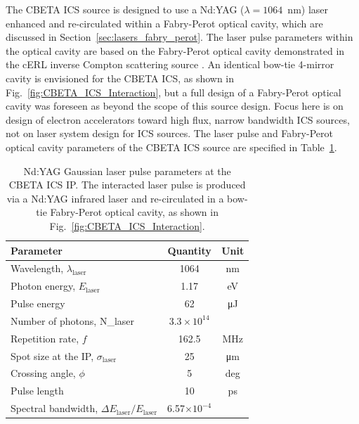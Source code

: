 \documentclass[../main.tex]{subfiles}
\begin{document}
The CBETA ICS source is designed to use a Nd:YAG ($\lambda=1064$~\si{\nano\meter}) laser enhanced and re-circulated within a Fabry-Perot optical cavity, which are discussed in Section~\ref{sec:lasers_fabry_perot}. The laser pulse parameters within the optical cavity are based on the Fabry-Perot optical cavity demonstrated in the cERL inverse Compton scattering source \cite{akagi2016narrow}. An identical bow-tie 4-mirror cavity is envisioned for the CBETA ICS, as shown in Fig.~\ref{fig:CBETA_ICS_Interaction}, but a full design of a Fabry-Perot optical cavity was foreseen as beyond the scope of this source design. Focus here is on design of electron accelerators toward high flux, narrow bandwidth ICS sources, not on laser system design for ICS sources. The laser pulse and Fabry-Perot optical cavity parameters of the CBETA ICS source are specified in Table~\ref{tab:CBETA_laser_pulse_design_parameters}. 
\begin{table}[!h]
\centering
\caption{Nd:YAG Gaussian laser pulse parameters at the CBETA ICS IP. The interacted laser pulse is produced via a Nd:YAG infrared laser and re-circulated in a bow-tie Fabry-Perot optical cavity, as shown in Fig.~\ref{fig:CBETA_ICS_Interaction}.}
\begin{tabular}{lcc}
\hline\hline
Parameter & Quantity & Unit \\
\hline
Wavelength, $\lambda_\textrm{laser}$ & 1064 & \si{\nano\meter}\\
Photon energy, $E_\textrm{laser}$ & 1.17 & \si{\electronvolt}\\
Pulse energy  & 62 & \si{\micro\joule}\\
Number of photons, N_{\textrm{laser}} & $3.3\times 10^{14}$\\ 
Repetition rate, $f$ & 162.5 & \si{\mega\hertz}\\
Spot size at the IP, $\sigma_\textrm{laser}$ & 25 & \si{\micro\meter}\\
Crossing angle, $\phi$ & 5 & deg \\
Pulse length  & 10 & \si{\pico\second}\\
Spectral bandwidth, $\Delta E_\textrm{laser}/E_\textrm{laser}$ & 6.57$\times 10^{-4}$ &   \\
\hline\hline
\end{tabular}
\label{tab:CBETA_laser_pulse_design_parameters}
\end{table}
\end{document}
